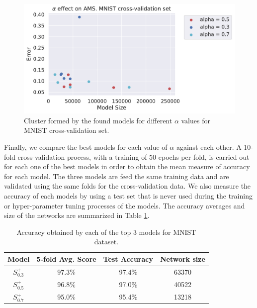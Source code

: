 \documentclass[preprint,12pt]{elsarticle}%
\begin{document}
\begin{figure}[H]
\centering
\includegraphics[scale=0.7]{Figures/alpha_mnist_cvset.pdf}
\caption{Cluster formed by the found models for different $\alpha$ values for MNIST cross-validation set.}
\label{fig:alpha_mnist_cluster_cvset}
\end{figure}

Finally, we compare the best models for each value of $\alpha$ against each other. A 10-fold cross-validation process, with a training of 50 epochs per fold, is carried out for each one of the best models in order to obtain the mean measure of accuracy for each model. The three models are feed the same training data and are validated using the same folds for the cross-validation data. We also measure the accuracy of each models by using a test set that is never used during the training or hyper-parameter tuning processes of the models. The accuracy averages and size of the networks are summarized in Table \ref{table:avg_accuracies_mnist}. 

\begin{table}[H]
\begin{center}
\begin{tabular}{| c | c | c | c |}
\hline
Model & 5-fold Avg. Score & Test Accuracy & Network size\\
\hline
$S^+_{0.3}$ & 97.3\% & 97.4\% & 63370\\
$S^+_{0.5}$ & 96.8\% & 97.0\% & 40522\\
$S^+_{0.7}$ & 95.0\% & 95.4\% & 13218\\
\hline
\end{tabular}
\end{center}
\caption{Accuracy obtained by each of the top 3 models for MNIST dataset.}
\label{table:avg_accuracies_mnist}
\end{table}
\end{document}
